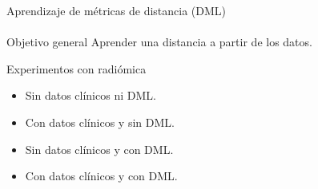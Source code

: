 \documentclass{beamer}
\begin{document}
\begin{frame}{Aprendizaje de métricas de distancia (DML)}
\framesubtitle{\insertsubsectionhead}

\begin{block}{Objetivo general}
Aprender una distancia a partir de los datos.
\end{block}




\vspace{0.5em}

\begin{block}{Experimentos con radiómica}
\begin{itemize}
    \item Sin datos clínicos ni DML.
    \item Con datos clínicos y sin DML.
    \item Sin datos clínicos y con DML.
    \item Con datos clínicos y con DML.
\end{itemize}
\end{block}

\end{frame}




\end{document}
